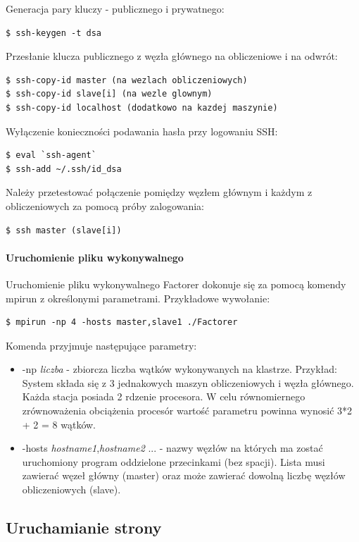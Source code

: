 \documentclass{article}
\begin{document}
Generacja pary kluczy - publicznego i prywatnego:
\begin{lstlisting}
$ ssh-keygen -t dsa
\end{lstlisting}

Przesłanie klucza publicznego z węzła głównego na obliczeniowe i na odwrót:
\begin{lstlisting}
$ ssh-copy-id master (na wezlach obliczeniowych)
$ ssh-copy-id slave[i] (na wezle glownym)
$ ssh-copy-id localhost (dodatkowo na kazdej maszynie)
\end{lstlisting}

Wyłączenie konieczności podawania hasła przy logowaniu SSH:
\begin{lstlisting}
$ eval `ssh-agent`
$ ssh-add ~/.ssh/id_dsa
\end{lstlisting}

Należy przetestować połączenie pomiędzy węzłem głównym i każdym z obliczeniowych za pomocą próby zalogowania:
\begin{lstlisting}
$ ssh master (slave[i])
\end{lstlisting}

\paragraph{Uruchomienie pliku wykonywalnego}
Uruchomienie pliku wykonywalnego Factorer dokonuje się za pomocą komendy mpirun z określonymi parametrami. Przykładowe wywołanie:
\begin{lstlisting}
$ mpirun -np 4 -hosts master,slave1 ./Factorer
\end{lstlisting}

Komenda przyjmuje następujące parametry:
\begin{itemize}
\item -np \textit{liczba} - zbiorcza liczba wątków wykonywanych na klastrze. Przykład:
System składa się z 3 jednakowych maszyn obliczeniowych i węzła głównego. Każda stacja posiada 2 rdzenie procesora. W celu równomiernego zrównoważenia obciążenia procesór wartość parametru powinna wynosić 3*2 + 2 = 8 wątków.

\item -hosts \textit{hostname1},\textit{hostname2} ... - nazwy węzłów na których ma zostać uruchomiony program oddzielone przecinkami (bez spacji). Lista musi zawierać węzeł główny (master) oraz może zawierać dowolną liczbę węzłów obliczeniowych (slave).
\end{itemize}

\subsection{Uruchamianie strony}
\end{document}
